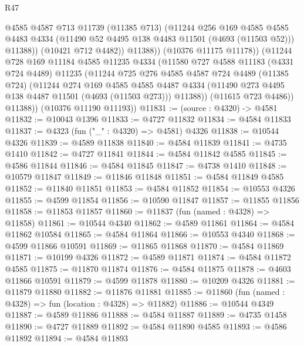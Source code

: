 \begin{lexlean}{R47}
\begin{coremodule}
                  @4585
                  @4587
                  @713
                  @11739
                  (@11385 @713)
                  (@11244
                    @256
                    @169
                    @4585
                    @4585
                    @4483
                    @4334
                    (@11490 @52 @4495 @138 @4483 @11501 (@4693 (@11503 @52)))
                    @11388))
                (@10421 @712 @4482))
              @11388))
          (@10376 @11175 @11178))
        (@11244
          @728
          @169
          @11184
          @4585
          @11235
          @4334
          (@11580
            @727
            @4588
            @11183
            (@4331 @724 @4489)
            @11235
            (@11244
              @725
              @276
              @4585
              @4587
              @724
              @4489
              (@11385 @724)
              (@11244
                @274
                @169
                @4585
                @4585
                @4487
                @4334
                (@11490 @273 @4495 @138 @4487 @11501 (@4693 (@11503 @273)))
                @11388))
            (@11615 @723 @4486))
          @11388))
      (@10376 @11190 @11193))
@11831 := (source : @4320) -> @4581
@11832 := @10043 @1396
@11833 := @4727 @11832
@11834 := @4584 @11833
@11837 := @4323 (fun ("_" : @4320) => @4581) @4326
@11838 := @10544 @4326
@11839 := @4589 @11838
@11840 := @4584 @11839
@11841 := @4735 @1410
@11842 := @4727 @11841
@11844 := @4584 @11842 @4585
@11845 := @4586 @11844
@11846 := @4584 @11845
@11847 := @4738 @1410
@11848 := @10579 @11847
@11849 := @11846 @11848
@11851 := @4584 @11849 @4585
@11852 := @11840 @11851
@11853 := @4584 @11852
@11854 := @10553 @4326
@11855 := @4599 @11854
@11856 := @10590 @11847
@11857 := @11855 @11856
@11858 := @11853 @11857
@11860 := @11837 (fun (named : @4328) => @11858)
@11861 := @10544 @4340
@11862 := @4589 @11861
@11864 := @4584 @11862 @10584
@11865 := @4584 @11864
@11866 := @10553 @4340
@11868 := @4599 @11866 @10591
@11869 := @11865 @11868
@11870 := @4584 @11869
@11871 := @10199 @4326
@11872 := @4589 @11871
@11874 := @4584 @11872 @4585
@11875 := @11870 @11874
@11876 := @4584 @11875
@11878 := @4603 @11866 @10591
@11879 := @4599 @11878
@11880 := @10209 @4326
@11881 := @11879 @11880
@11882 := @11876 @11881
@11885 := @11860 (fun (named : @4328) => fun (location : @4328) => @11882)
@11886 := @10544 @4349
@11887 := @4589 @11886
@11888 := @4584 @11887
@11889 := @4735 @1458
@11890 := @4727 @11889
@11892 := @4584 @11890 @4585
@11893 := @4586 @11892
@11894 := @4584 @11893

\end{coremodule}
\end{lexlean}
